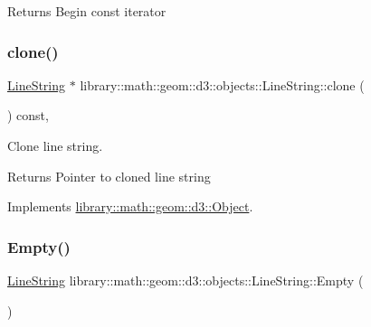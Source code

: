 \begin{DoxyReturn}{Returns}
Begin const iterator 
\end{DoxyReturn}
\mbox{\label{classlibrary_1_1math_1_1geom_1_1d3_1_1objects_1_1_line_string_a95ef100ab7053589b845980ca4c845b3}} 
\subsubsection{\texorpdfstring{clone()}{clone()}}
{\footnotesize\ttfamily \hyperlink{classlibrary_1_1math_1_1geom_1_1d3_1_1objects_1_1_line_string}{Line\+String} $\ast$ library\+::math\+::geom\+::d3\+::objects\+::\+Line\+String\+::clone (\begin{DoxyParamCaption}{ }\end{DoxyParamCaption}) const\hspace{0.3cm}{\ttfamily [override]}, {\ttfamily [virtual]}}



Clone line string. 

\begin{DoxyReturn}{Returns}
Pointer to cloned line string 
\end{DoxyReturn}


Implements \hyperlink{classlibrary_1_1math_1_1geom_1_1d3_1_1_object_a1a784c6b359e0eb97cd34fabc42f2f3f}{library\+::math\+::geom\+::d3\+::\+Object}.

\mbox{\label{classlibrary_1_1math_1_1geom_1_1d3_1_1objects_1_1_line_string_ae9e05ddb3ab59060c78d18e19624f307}} 
\subsubsection{\texorpdfstring{Empty()}{Empty()}}
{\footnotesize\ttfamily \hyperlink{classlibrary_1_1math_1_1geom_1_1d3_1_1objects_1_1_line_string}{Line\+String} library\+::math\+::geom\+::d3\+::objects\+::\+Line\+String\+::\+Empty (\begin{DoxyParamCaption}{ }\end{DoxyParamCaption})\hspace{0.3cm}{\ttfamily [static]}}



